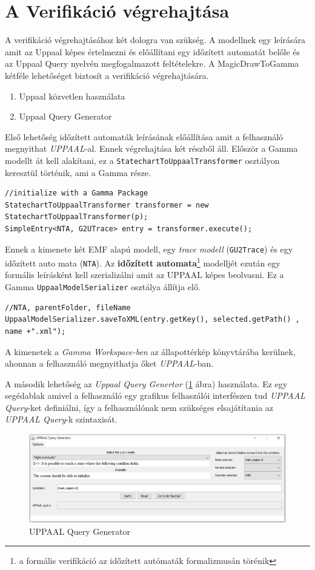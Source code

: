 \section{A Verifikáció végrehajtása}
A verifikáció végrehajtásához két dologra van szükség. A modellnek egy leírására amit az Uppaal képes értelmezni és előállítani egy időzített automatát belőle és az Uppaal Query nyelvén megfogalmazott feltételekre. A MagicDrawToGamma kétféle lehetőséget biztosít a verifikáció végrehajtására.

\begin{enumerate}
	\item Uppaal közvetlen használata
	\item Uppaal Query Generator
	\label{en:fels}
\end{enumerate}

Első lehetőség időzített automaták leírásának előállítása amit a felhasználó megnyithat \emph{UPPAAL}-al. Ennek végrehajtása két részből áll. Először a Gamma modellt át kell alakítani, ez a \verb+StatechartToUppaalTransformer+ osztályon keresztül történik, ami a Gamma része.
\begin{lstlisting}
//initialize with a Gamma Package
StatechartToUppaalTransformer transformer = new StatechartToUppaalTransformer(p);
SimpleEntry<NTA, G2UTrace> entry = transformer.execute();
\end{lstlisting}
Ennek a kimenete két EMF alapú modell, egy \emph{trace modell} (\verb+GU2Trace+) és egy időzített auto
mata (\verb+NTA+). Az \textbf{időzített automata}\footnote{a formális verifikáció az időzített autómaták formalizmusán törénik} modelljét ezután egy formális leírásként kell szerializálni amit az UPPAAL képes beolvasni. Ez a Gamma \verb+UppaalModelSerializer+ osztálya állítja elő. 
\begin{lstlisting}
//NTA, parentFolder, fileName
UppaalModelSerializer.saveToXML(entry.getKey(), selected.getPath() , name +".xml");
\end{lstlisting}
A kimenetek a \emph{Gamma Workspace-ben} az állapottérkép könyvtárába kerülnek, ahonnan a felhasználó megnyithatja őket \emph{UPPAAL}-ban.

A második lehetőség az \emph{Uppaal Query Genertor} (\ref{fig:upp-query-gen} ábra) használata. Ez egy segédablak amivel a felhasználó egy grafikus felhaszálói interfészen tud \emph{UPPAAL Query}-ket definiálni, így a felhasználónak nem szükséges elsajátítania az \emph{UPPAAL Query}-k szintaxisát.

\begin{figure}[!ht]
	\centering
	\includegraphics[keepaspectratio, width=150mm]{figures/query-gen.png}
	\caption{UPPAAL Query Generator}
	\label{fig:upp-query-gen}
\end{figure}

